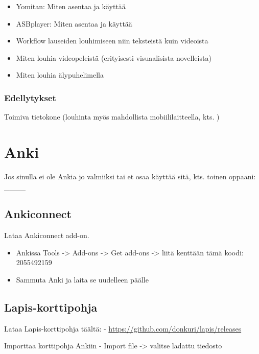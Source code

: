 \documentclass[
]{book}
\begin{document}
\begin{itemize}
\item
  Yomitan: Miten asentaa ja käyttää
\item
  ASBplayer: Miten asentaa ja käyttää
\item
  Workflow lauseiden louhimiseen niin teksteistä kuin videoista
\item
  Miten louhia videopeleistä (erityisesti visuaalisista novelleista)
\item
  Miten louhia älypuhelimella
\end{itemize}

\subsection*{Edellytykset}\label{edellytykset}

Toimiva tietokone (louhinta myös mahdollista mobiililaitteella, kts. )

\chapter{Anki}\label{anki}

Jos sinulla ei ole Ankia jo valmiiksi tai et osaa käyttää sitä, kts. toinen oppaani: \_\_\_\_

\section{Ankiconnect}\label{ankiconnect}

Lataa Ankiconnect add-on.

\begin{itemize}
\item
  Ankissa Tools -\textgreater{} Add-ons -\textgreater{} Get add-ons -\textgreater{} liitä kenttään tämä koodi: 2055492159
\item
  Sammuta Anki ja laita se uudelleen päälle
\end{itemize}

\section{Lapis-korttipohja}\label{lapis-korttipohja}

Lataa Lapis-korttipohja täältä:
- \url{https://github.com/donkuri/lapis/releases}

Importtaa korttipohja Ankiin
- Import file -\textgreater{} valitse ladattu tiedosto
\end{document}
